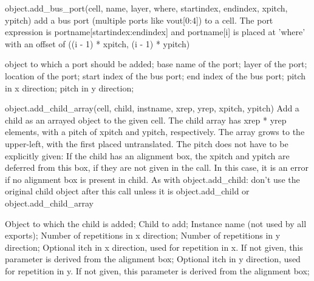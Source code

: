 \begin{APIfunc}{object.add\_bus\_port(cell, name, layer, where, startindex, endindex, xpitch, ypitch)}
    add a bus port (multiple ports like vout[0:4]) to a cell. The port expression is portname[startindex:endindex] and portname[i] is placed at 'where' with an offset of ((i - 1) * xpitch, (i - 1) * ypitch)
    \begin{APIparameters}
            object to which a port should be added;
            base name of the port;
            layer of the port;
            location of the port;
            start index of the bus port;
            end index of the bus port;
            pitch in x direction;
            pitch in y direction;
    \end{APIparameters}
\end{APIfunc}
\begin{APIfunc}{object.add\_child\_array(cell, child, instname, xrep, yrep, xpitch, ypitch)}
    Add a child as an arrayed object to the given cell. The child array has xrep * yrep elements, with a pitch of xpitch and ypitch, respectively. The array grows to the upper-left, with the first placed untranslated. The pitch does not have to be explicitly given: If the child has an alignment box, the xpitch and ypitch are deferred from this box, if they are not given in the call. In this case, it is an error if no alignment box is present in child. As with object.add\_child: don't use the original child object after this call unless it is object.add\_child or object.add\_child\_array
    \begin{APIparameters}
            Object to which the child is added;
            Child to add;
            Instance name (not used by all exports);
            Number of repetitions in x direction;
            Number of repetitions in y direction;
            Optional itch in x direction, used for repetition in x. If not given, this parameter is derived from the alignment box;
            Optional itch in y direction, used for repetition in y. If not given, this parameter is derived from the alignment box;
    \end{APIparameters}
\end{APIfunc}
